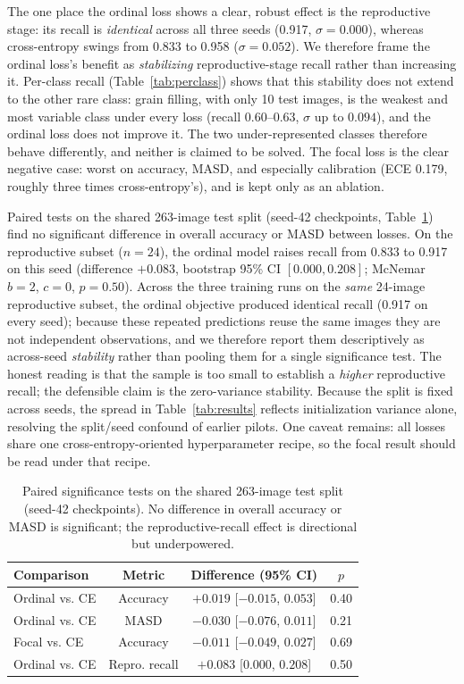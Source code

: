 \documentclass{llncs}
\begin{document}
The one place the ordinal loss shows a clear, robust effect is the reproductive stage: its recall is \emph{identical} across all three seeds (0.917, $\sigma=0.000$), whereas cross-entropy swings from 0.833 to 0.958 ($\sigma=0.052$). We therefore frame the ordinal loss's benefit as \emph{stabilizing} reproductive-stage recall rather than increasing it. Per-class recall (Table~\ref{tab:perclass}) shows that this stability does not extend to the other rare class: grain filling, with only 10 test images, is the weakest and most variable class under every loss (recall $0.60$--$0.63$, $\sigma$ up to $0.094$), and the ordinal loss does not improve it. The two under-represented classes therefore behave differently, and neither is claimed to be solved. The focal loss is the clear negative case: worst on accuracy, MASD, and especially calibration (ECE 0.179, roughly three times cross-entropy's), and is kept only as an ablation.

Paired tests on the shared 263-image test split (seed-42 checkpoints, Table~\ref{tab:paired}) find no significant difference in overall accuracy or MASD between losses. On the reproductive subset ($n=24$), the ordinal model raises recall from 0.833 to 0.917 on this seed (difference $+0.083$, bootstrap 95\% CI $[0.000,0.208]$; McNemar $b{=}2$, $c{=}0$, $p{=}0.50$). Across the three training runs on the \emph{same} 24-image reproductive subset, the ordinal objective produced identical recall (0.917 on every seed); because these repeated predictions reuse the same images they are not independent observations, and we therefore report them descriptively as across-seed \emph{stability} rather than pooling them for a single significance test. The honest reading is that the sample is too small to establish a \emph{higher} reproductive recall; the defensible claim is the zero-variance stability. Because the split is fixed across seeds, the spread in Table~\ref{tab:results} reflects initialization variance alone, resolving the split/seed confound of earlier pilots. One caveat remains: all losses share one cross-entropy-oriented hyperparameter recipe, so the focal result should be read under that recipe.

\begin{table}[t]
\centering
\caption{Paired significance tests on the shared 263-image test split (seed-42 checkpoints). No difference in overall accuracy or MASD is significant; the reproductive-recall effect is directional but underpowered.}
\label{tab:paired}
\small
\begin{tabular}{lccc}
\toprule
\textbf{Comparison} & \textbf{Metric} & \textbf{Difference (95\% CI)} & \textbf{$p$} \\
\midrule
Ordinal vs. CE & Accuracy & $+0.019$ [$-0.015$, $0.053$] & 0.40 \\
Ordinal vs. CE & MASD & $-0.030$ [$-0.076$, $0.011$] & 0.21 \\
Focal vs. CE & Accuracy & $-0.011$ [$-0.049$, $0.027$] & 0.69 \\
Ordinal vs. CE & Repro. recall & $+0.083$ [$0.000$, $0.208$] & 0.50 \\
\bottomrule
\end{tabular}
\end{table}
\end{document}
